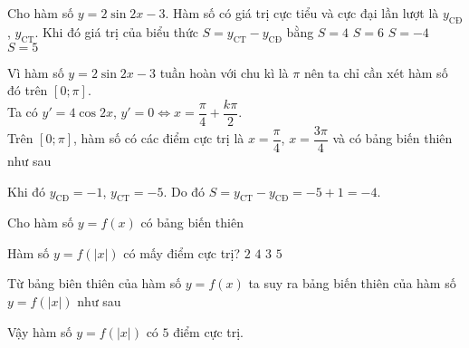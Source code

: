 \begin{ex}%
Cho hàm số $y=2\sin 2x-3$. Hàm số có giá trị cực tiểu và cực đại lần lượt là $y_\text{CĐ}$, $y_\text{CT}$. Khi
đó giá trị của biểu thức $S=y_\text{CT}-y_\text{CĐ}$ bằng
	\choice
	{$S=4$}
	{$S=6$}
	{\True $S=-4$}
	{$S=5$}
	\loigiai
	{Vì hàm số $y=2\sin 2x-3$ tuần hoàn với chu kì là $\pi$ nên ta chỉ cần xét hàm số đó trên $[0;\pi]$.\\
		Ta có $y'=4\cos2x$, $y'=0\Leftrightarrow x=\dfrac{\pi}{4}+\dfrac{k\pi}{2}$.\\
Trên $[0;\pi]$, hàm số có các điểm cực trị là $x=\dfrac{\pi}{4}$, $x=\dfrac{3\pi}{4}$ và có bảng biến thiên như sau
\begin{center}
\end{center}
Khi đó $y_\text{CĐ}=-1$, $y_\text{CT}=-5$. Do đó $S=y_\text{CT}-y_\text{CĐ}=-5+1=-4$.}
\end{ex}

\begin{ex}%
Cho hàm số $y=f(x)$	có bảng biến thiên
\begin{center}
\end{center}
Hàm số $y=f(|x|)$ có mấy điểm cực trị?
	\choice
	{$2$}
	{$4$}
	{$3$}
	{\True $5$}
	\loigiai
	{Từ bảng biên thiên của hàm số $y=f(x)$ ta suy ra bảng biến thiên của hàm số $y=f(|x|)$ như sau
	\begin{center}
\end{center}
Vậy hàm số $y=f(|x|)$ có $5$ điểm cực trị.
}
\end{ex}

